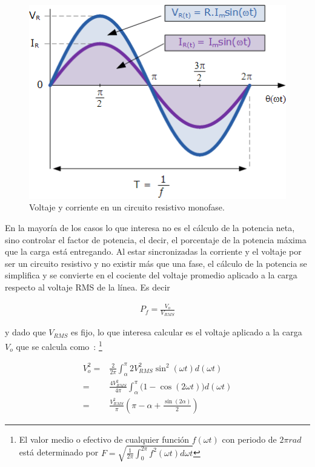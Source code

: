 \begin{figure}[H]
	\centering
	\includegraphics{img/ac-v-i.png}
	\caption[Voltaje y corriente en un circuito resistivo monofase]%
	{Voltaje y corriente en un circuito resistivo monofase.\footnotemark{}}%
	\label{fig:ac-v-i}
\end{figure}

En la mayoría de los casos lo que interesa no es el cálculo de la potencia neta, sino controlar el factor de potencia, el decir, el porcentaje de la potencia máxima que la carga está entregando.
Al estar sincronizadas la corriente y el voltaje por ser un circuito resistivo y no existir más que una fase, el cálculo de la potencia se simplifica y se convierte en el cociente del voltaje promedio aplicado a la carga respecto al voltaje RMS de la línea.
Es decir

\begin{align}
	P_f = \frac{V_o}{V_{RMS}}
	\label{eq:pf}
\end{align}

\noindent y dado que $V_{RMS}$ es fijo, lo que interesa calcular es el voltaje aplicado a la carga $V_o$ que se calcula como~:%
\footnote{El valor medio o efectivo de cualquier función $f(\omega t)$ con periodo de $2\pi rad$ está determinado por
	$F = \sqrt{
		\frac{1}{2\pi}
		\int^{2\pi}_0
		f^2\left(\omega t\right) d\omega t
	}$
}

\begin{align}
	V^2_o = &
		\frac{2}{2\pi}
		\int^\pi_\alpha
		2V^2_{RMS}\sin^2\left(\omega t\right)
		d\left(\omega t\right)
		\\
	= &
		\frac{4V^2_{RMS}}{4\pi}
		\int^\pi_\alpha
		\big(1-\cos\left(2\omega t\right)\big)
		d\left(\omega t\right)
		\\
	= &
		\frac{V^2_{RMS}}{\pi}
		\left(
			\pi-\alpha + \frac{\sin\left(2\alpha\right)}{2}
		\right)
\end{align}

